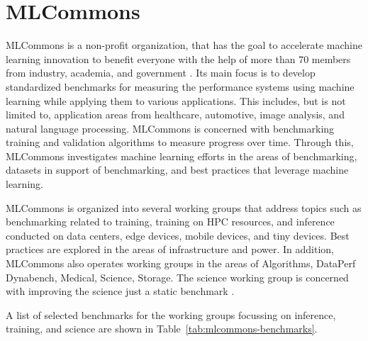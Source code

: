 
\section{MLCommons}

MLCommons is a non-profit organization, that has the goal to
accelerate machine learning innovation to benefit everyone with the
help of more than 70 members from industry, academia, and government
\cite{www-mlcommons}. Its main focus is to develop standardized
benchmarks for measuring the performance systems using machine
learning while applying them to various applications.  This includes,
but is not limited to, application areas from healthcare, automotive,
image analysis, and natural language processing. MLCommons is
concerned with benchmarking training \cite{mlperf-training} and
validation algorithms to measure progress over time.  Through this,
MLCommons investigates machine learning efforts in the areas of
benchmarking, datasets in support of benchmarking, and best practices
that leverage machine learning.

MLCommons is organized into several working groups that address topics
such as benchmarking related to training, training on HPC resources,
and inference conducted on data centers, edge devices, mobile devices, and
tiny devices. Best practices are explored in the areas of
infrastructure and power.  In addition, MLCommons also operates
working groups in the areas of Algorithms, DataPerf Dynabench,
Medical, Science, Storage.  The science working group is concerned
with improving the science just a static benchmark \cite{las-22-mlcommons-science}.

A list of selected benchmarks for the working groups focussing on
inference, training, and science are shown in Table~\ref{tab:mlcommons-benchmarks}.


